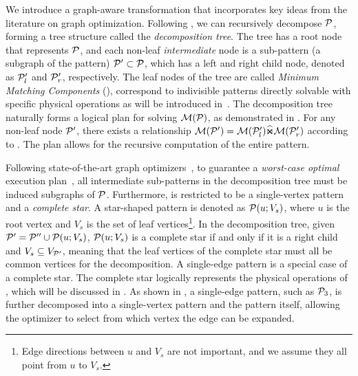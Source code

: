 We introduce a graph-aware transformation that incorporates key ideas from the literature on graph optimization. Following , we can recursively decompose $\mathcal{P}$, forming a tree structure called the \emph{decomposition tree}. The tree has a root node that represents $\mathcal{P}$, and each non-leaf \emph{intermediate} node is a sub-pattern (a subgraph of the pattern) $\mathcal{P}' \subset \mathcal{P}$, which has a left and right child node, denoted as $\mathcal{P}'_l$ and $\mathcal{P}'_r$, respectively. %
The leaf nodes of the tree are called \emph{Minimum Matching Components} (\mmc), correspond to indivisible patterns directly solvable with specific physical operations
as will be introduced in~. The decomposition tree naturally forms a logical plan for solving $\mathcal{M}(\mathcal{P})$, as demonstrated in . For any non-leaf node $\mathcal{P}'$, there exists a relationship $\mathcal{M}(\mathcal{P}') = \mathcal{M}(\mathcal{P}'_l) \widehat{\Join} \mathcal{M}(\mathcal{P}'_r)$ according to . The plan allows for the recursive computation of the entire pattern.

Following state-of-the-art graph optimizers~\cite{huge,GLogS}, to guarantee a \emph{worst-case optimal} execution plan~\cite{ngo2018worst}, all intermediate sub-patterns in the decomposition tree must be induced subgraphs of $\mathcal{P}$. Furthermore, \mmc is restricted to be a single-vertex pattern and a \emph{complete star}. A star-shaped pattern is denoted as $\mathcal{P}(u;V_s)$, where $u$ is the root vertex and $V_s$ is the set of leaf vertices\footnote{Edge directions between $u$ and $V_s$ are not important, and we assume they all point from $u$ to $V_s$.}. In the decomposition tree, given $\mathcal{P}' = \mathcal{P}'' \cup \mathcal{P}(u;V_s)$, $\mathcal{P}(u;V_s)$ is a complete star if and only if it is a right child and $V_s \subseteq V_{\mathcal{P}'}$, meaning that the leaf vertices of the complete star must all be common vertices for the decomposition. A single-edge pattern is a special case of a complete star. The complete star logically represents the physical operations of \expandintersect, which will be discussed in . As shown in , a single-edge pattern, such as $\mathcal{P}_3$, is further decomposed into a single-vertex pattern and the pattern itself, allowing the optimizer to select from which vertex the edge can be expanded.



